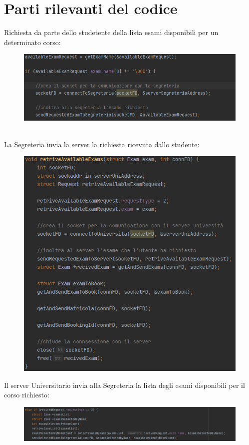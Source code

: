\documentclass{article}
\begin{document}
\newpage
\section{Parti rilevanti del codice}
Richiesta da parte dello studetente della lista esami disponibili per un determinato corso:
\begin{figure}[htp]
    \centering
    \includegraphics[width=1\linewidth]{richiesta esami disponibili.png}
\end{figure}
\\La Segreteria invia la server la richiesta ricevuta dallo studente:
\begin{figure}[htp]
    \centering
    \includegraphics[width=0.8\linewidth]{retriveAvailableExamsSegreteria.png}
\end{figure}
\newpage
Il server Universitario invia alla Segreteria la lista degli esami disponibili per il corso richiesto:
\begin{figure}[htp]
    \centering
    \includegraphics[width=1\linewidth]{retriveExamsListUnipng.png}
\end{figure}
\end{document}
